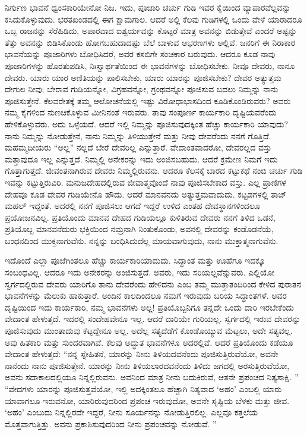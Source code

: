 ನಿರ್ಗುಣ ಭಾವನೆ ಧ್ವಂಸಕಾರಿಯೇನೋ ನಿಜ. ಇದು, ಪೂಜಾರಿ ಚರ್ಚು ಗುಡಿ ಇವರ ಕೈಯಿಂದ ವ್ಯಾಪಾರವೆಲ್ಲವನ್ನು ಕಸಿದುಕೊಳ್ಳುವುದು. ಭರತಖಂಡದಲ್ಲಿ ಈಗ ಕ್ಷಾಮಗಾಲ. ಆದರೆ ಅಲ್ಲಿ ಕೆಲವು ಗುಡಿಗಳಲ್ಲಿ ಒಂದು ವೇಳೆ ಯಾರಾದರೂ ಒಬ್ಬ ರಾಜನನ್ನು ಸೆರೆಹಿಡಿದು, ಅಪಾರವಾದ ಐಶ್ವರ್ಯವನ್ನು ಕೊಟ್ಟರೆ ಮಾತ್ರ ಅವನನ್ನು ಬಿಡುತ್ತೇವೆ ಎಂದರೆ ಅಷ್ಟನ್ನು ತೆತ್ತು ಅವನನ್ನು ಬಿಡಿಸಿಕೊಂಡು ಹೋಗಬಹುದಾದಷ್ಟು ಬೆಲೆ ಬಾಳುವ ಆಭರಣಗಳು ಅಲ್ಲಿವೆ. ಜನರಿಗೆ ಈ ನಿರಾಕಾರ ಭಾವನೆಯನ್ನು ಪೂಜಾರಿಗಳು ಬೋಧಿಸಿದರೆ, ಅವರ ಕಸಬಿಗೇ ಸಂಚಕಾರ ಬರುವುದು. ಆದರೂ ಕೂಡ ನಾವು ಪೂಜಾರಿಗಳನ್ನು ಹೊರತುಪಡಿಸಿ, ನಿಃಸ್ವಾರ್ಥತೆಯಿಂದ ಈ ಭಾವನೆಗಳನ್ನು ಬೋಧಿಸಬೇಕು. ನೀವೂ ದೇವರು, ನಾನೂ ದೇವರು. ಯಾರು ಯಾರ ಅಣಿತಿಯನ್ನು ಪಾಲಿಸಬೇಕು, ಯಾರು ಯಾರನ್ನು ಪೂಜಿಸಬೇಕು? ದೇವರ ಅತ್ಯುತ್ತಮ ದೇಗುಲ ನೀವು; ಬೇರಾವ ಗುಡಿಯನ್ನೋ, ವಿಗ್ರಹವನ್ನೋ, ಗ್ರಂಥವನ್ನೋ ಪೂಜಿಸುವ ಬದಲು ನಿಮ್ಮನ್ನು ನಾನು ಪೂಜಿಸುತ್ತೇನೆ. ಕೆಲವರೇತಕ್ಕೆ ತಮ್ಮ ಆಲೋಚನೆಯಲ್ಲಿ ಇಷ್ಟು ವಿರೋಧಾಭಾಸದಿಂದ ಕೂಡಿಕೊಂಡಿರುವರು? ಅವರು ನಮ್ಮ ಕೈಗಳಿಂದ ನುಣಚಿಕೊಳ್ಳುವ ಮೀನಿನಂತೆ ಇರುವರು. ತಾವು ಸಂಪೂರ್ಣ ಕಾರ್ಯಕಾರಿ ದೃಷ್ಟಿಯವರೆಂದು ಹೇಳಿಕೊಳ್ಳುವರು. ಅದು ಒಳ್ಳೆಯದೆ. ಆದರೆ ಇಲ್ಲಿ ನಿಮ್ಮನ್ನು ಪೂಜಿಸುವುದಕ್ಕಿಂತ ಹೆಚ್ಚು ಕಾರ್ಯಕಾರಿ ಯಾವುದು? ನಾನು ನಿಮ್ಮನ್ನು ನೋಡುತ್ತೇನೆ, ನಾನು ನಿಮ್ಮನ್ನು ತಿಳಿಯುತ್ತೇನೆ ಮತ್ತು ನೀವು ದೇವರೆಂದು ನನಗೆ ಗೊತ್ತಿದೆ. ಮಹಮ್ಮದೀಯರು “ಅಲ್ಲ” ನಲ್ಲದೆ ಬೇರೆ ದೇವರಿಲ್ಲ ಎನ್ನುತ್ತಾರೆ. ವೇದಾಂತವಾದರೋ, ದೇವರಲ್ಲದ ವಸ್ತು ಮತ್ತಾವುದೂ ಇಲ್ಲ ಎನ್ನುತ್ತದೆ. ನಿಮ್ಮಲ್ಲಿ ಅನೇಕರನ್ನು ಇದು ಅಂಜಿಸಬಹುದು. ಆದರೆ ಕ್ರಮೇಣ ನಿಮಗೆ ಇದು ಗೊತ್ತಾಗುತ್ತದೆ. ಜೀವಂತನಾಗಿರುವ ದೇವರು ನಿಮ್ಮಲ್ಲಿರುವನು. ಆದರೂ ಕೆಲಸಕ್ಕೆ ಬಾರದ ಕಟ್ಟುಕಥೆ ನಂಬಿ ಚರ್ಚು ಗುಡಿ ಇವನ್ನು ಕಟ್ಟುತ್ತಿರುವಿರಿ. ಮನುಜದೇಹದಲ್ಲಿರುವ ಜೀವಾತ್ಮವೊಂದೆ ನಾವು ಪೂಜಿಸಬೇಕಾದ ವಸ್ತು. ಎಲ್ಲ ಪ್ರಾಣಿಗಳ ದೇಹವೂ ಕೂಡ ದೇವರ ಗುಡಿಯೇನೊ ಹೌದು. ಆದರೆ ಮಾನವನದು ಅತ್ಯುತ್ತಮವಾದುದು. ಕಟ್ಟಡಗಳಲ್ಲಿ ತಾಜ್​ ಮಹಲ್​ ಇದ್ದಂತೆ. ಅದರಲ್ಲಿ ನನಗೆ ಪೂಜಿಸಲು ಆಗದೆ ಇದ್ದರೆ ಉಳಿದ ಎಂತಹ ದೇವಸ್ಥಾನಗಳಿಂದಲೂ ಪ್ರಯೋಜನವಿಲ್ಲ. ಪ್ರತಿಯೊಂದು ಮಾನವ ದೇಹದ ಗುಡಿಯಲ್ಲೂ ಕುಳಿತಿರುವ ದೇವರು ನನಗೆ ತಿಳಿದ ಒಡನೆ, ಪ್ರತಿಯೊಬ್ಬ ಮಾನವನೆದುರು ಭಕ್ತಿಯಿಂದ ನಮ್ರನಾಗಿ ನಿಂತುಕೊಂಡು, ಅವನಲ್ಲಿ ದೇವರನ್ನು ಕಂಡೊಡನೆಯೆ, ಬಂಧನದಿಂದ ಮುಕ್ತನಾಗುವೆನು. ನನ್ನನ್ನು ಬಂಧಿಸಿದುದೆಲ್ಲ ಮಾಯವಾಗುವುದು, ನಾನು ಮುಕ್ತಾತ್ಮನಾಗುವೆನು. 

\vskip 6pt

ಇದೊಂದೆ ಎಲ್ಲಾ ಪೂಜೆಗಿಂತಲೂ ಹೆಚ್ಚು ಕಾರ್ಯಕಾರಿಯಾದುದು. ಸಿದ್ಧಾಂತ ಮತ್ತು ಊಹೆಗೂ ಇದಕ್ಕೂ ಸಂಬಂಧವಿಲ್ಲ. ಆದರೂ ಇದು ಅನೇಕರನ್ನು ಅಂಜಿಸುತ್ತದೆ. ಅವರು, ಇದು ಸರಿಯಲ್ಲವೆನ್ನುವರು. ಎಲ್ಲಿಯೋ ಸ್ವರ್ಗದಲ್ಲಿರುವ ದೇವರು ಯಾರಿಗೊ ತಾನು ದೇವರೆಂದು ಹೇಳಿದನು ಎಂಬ ತಮ್ಮ ಮುತ್ತಾತಂದಿರಿಂದ ಕೇಳಿದ ಪುರಾತನ ಭಾವನೆಗಳನ್ನು ಮೆಲುಕು ಹಾಕುತ್ತಾರೆ. ಅಂದಿನ ಕಾಲದಿಂದಲೂ ನಮಗೆ ಇರುವುದು ಬರಿಯ ಸಿದ್ಧಾಂತಗಳೆ. ಅವರ ದೃಷ್ಟಿಯಿಂದ ಇದು ಕಾರ್ಯಕಾರಿ, ನಮ್ಮ ಭಾವನೆಗಳು ಅಲ್ಲ! ಪ್ರತಿಯೊಬ್ಬನಿಗೂ ತನ್ನದೇ ಒಂದು ದಾರಿ ಇರಬೇಕೆಂದು ವೇದಾಂತ ಹೇಳುತ್ತದೆ. ಇದರಲ್ಲಿ ಸಂದೇಹವೇನೂ ಇಲ್ಲ. ಆದರೆ ದಾರಿಯೇ ಗುರಿಯಲ್ಲ. ಸ್ವರ್ಗದಲ್ಲಿ ಇರುವ ದೇವರನ್ನು ಪೂಜಿಸುವುದು ಮುಂತಾದುವು ಕೆಟ್ಟದ್ದೇನೂ ಅಲ್ಲ. ಅದೆಲ್ಲ ಸತ್ಯದೆಡೆಗೆ ಕೊಂಡೊಯ್ಯುವ ಮೆಟ್ಟಲು, ಅದೇ ಸತ್ಯವಲ್ಲ. ಅವು ಹಿತಕಾರಿ ಮತ್ತು ಸುಂದರವಾಗಿವೆ. ಕೆಲವು ಅದ್ಭುತ ಭಾವನೆಗಳೂ ಅದರಲ್ಲಿವೆ. ಆದರೆ ಪ್ರತಿಯೊಂದು ಕಡೆಯೂ ವೇದಾಂತ ಹೇಳುತ್ತದೆ: “ನನ್ನ ಸ್ನೇಹಿತನೆ, ಯಾರನ್ನು ನೀನು ತಿಳಿಯದವನೆಂದು ಪೂಜಿಸುತ್ತಿರುವೆಯೋ, ಅವನೇ ನಾನೆಂದು ನಾನು ಪೂಜಿಸುತ್ತೇನೆ. ಯಾರನ್ನು ನೀನು ತಿಳಿಯಲಾರದವನೆಂದು ತಿಳಿದು ಜಗದಲ್ಲಿ ಅರಸುತ್ತಿರುವೆಯೋ, ಅವನು ಸದಾಕಾಲದಲ್ಲಿಯೂ ನಿನ್ನಲ್ಲಿರುವನು. ಅವನಿಂದ ಮಾತ್ರ ನೀನು ಬದುಕಿರುವೆ, ಆತನೇ ಪ್ರಪಂಚದ ನಿತ್ಯಸಾಕ್ಷಿ. ” “ವೇದಗಳು ಯಾರನ್ನು ಪೂಜಿಸುತ್ತವೆಯೋ, ಇಲ್ಲಿ ಅದಕ್ಕಿಂತಲೂ ಹೆಚ್ಚಾಗಿ ನಿತ್ಯವಾದ ‘ಅಹಂ’ ಎಂಬಲ್ಲಿ ಯಾರು ಯಾವಾಗಲೂ ಇರುವನೋ, ಯಾರಿರುವುದರಿಂದ ಪ್ರಪಂಚ ಇರುವುದೋ, ಅವನೇ ಸೃಷ್ಟಿಯ ಬೆಳಕು ಮತ್ತು ಜೀವ. ‘ಅಹಂ’ ಎಂಬುದು ನಿನ್ನಲ್ಲಿರದೇ ಇದ್ದರೆ, ನೀನು ಸೂರ್ಯನನ್ನು ನೋಡುತ್ತಿರಲಿಲ್ಲ. ಎಲ್ಲವೂ ಕತ್ತಲೆಯ ಮೊತ್ತವಾಗುತ್ತಿತ್ತು. ಅವನು ಪ್ರಕಾಶಿಸುವುದರಿಂದ ನೀನು ಪ್ರಪಂಚವನ್ನು ನೋಡುವೆ. ”

